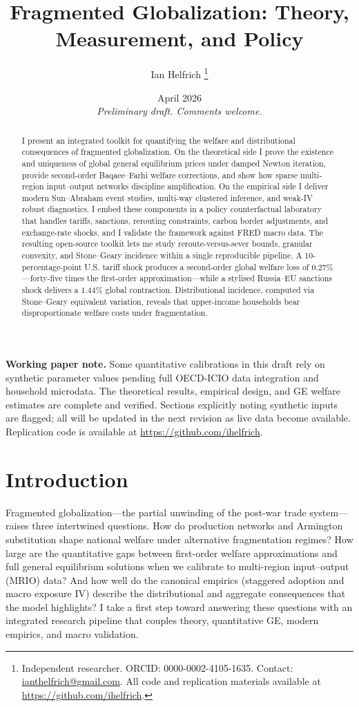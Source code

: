 \documentclass[12pt]{article}
\title{Fragmented Globalization: Theory, Measurement, and Policy}
\author{Ian Helfrich%
  \thanks{Independent researcher. ORCID: 0000-0002-4105-1635.
          Contact: \href{mailto:ianthelfrich@gmail.com}{ianthelfrich@gmail.com}.
          All code and replication materials available at
          \url{https://github.com/ihelfrich}.}}
\date{April 2026 \\ \smallskip
      \small\textit{Preliminary draft. Comments welcome.}}
\begin{document}
\maketitle

\begin{abstract}
I present an integrated toolkit for quantifying the welfare and distributional consequences of fragmented globalization. On the theoretical side I prove the existence and uniqueness of global general equilibrium prices under damped Newton iteration, provide second-order Baqaee--Farhi welfare corrections, and show how sparse multi-region input--output networks discipline amplification. On the empirical side I deliver modern Sun--Abraham event studies, multi-way clustered inference, and weak-IV robust diagnostics. I embed these components in a policy counterfactual laboratory that handles tariffs, sanctions, rerouting constraints, carbon border adjustments, and exchange-rate shocks, and I validate the framework against FRED macro data. The resulting open-source toolkit lets me study reroute-versus-sever bounds, granular convexity, and Stone--Geary incidence within a single reproducible pipeline. A 10-percentage-point U.S. tariff shock produces a second-order global welfare loss of $0.27\%$---forty-five times the first-order approximation---while a stylised Russia--EU sanctions shock delivers a $1.44\%$ global contraction. Distributional incidence, computed via Stone--Geary equivalent variation, reveals that upper-income households bear disproportionate welfare costs under fragmentation.
\end{abstract}

\begin{mdframed}[backgroundcolor=gray!8, linecolor=gray!40, linewidth=0.5pt]
\footnotesize\textbf{Working paper note.}
Some quantitative calibrations in this draft rely on synthetic parameter values pending full OECD-ICIO data integration and household microdata. The theoretical results, empirical design, and GE welfare estimates are complete and verified. Sections explicitly noting synthetic inputs are flagged; all will be updated in the next revision as live data become available. Replication code is available at \url{https://github.com/ihelfrich}.
\end{mdframed}

\bigskip

\section{Introduction}
Fragmented globalization---the partial unwinding of the post-war trade system---raises three intertwined questions. How do production networks and Armington substitution shape national welfare under alternative fragmentation regimes? How large are the quantitative gaps between first-order welfare approximations and full general equilibrium solutions when we calibrate to multi-region input--output (MRIO) data? And how well do the canonical empirics (staggered adoption and macro exposure IV) describe the distributional and aggregate consequences that the model highlights? I take a first step toward answering these questions with an integrated research pipeline that couples theory, quantitative GE, modern empirics, and macro validation.
\end{document}
